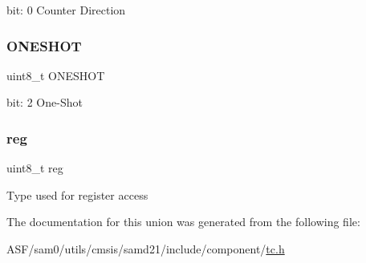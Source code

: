 bit\+: 0 Counter Direction \mbox{\label{union_t_c___c_t_r_l_b_c_l_r___type_a7b9c94dc8f69244e81941bd1c96ca561}} 
\subsubsection{\texorpdfstring{ONESHOT}{ONESHOT}}
{\footnotesize\ttfamily uint8\+\_\+t O\+N\+E\+S\+H\+OT}

bit\+: 2 One-\/\+Shot \mbox{\label{union_t_c___c_t_r_l_b_c_l_r___type_a9428adc9af4653a2050e2536b55dec8d}} 
\subsubsection{\texorpdfstring{reg}{reg}}
{\footnotesize\ttfamily uint8\+\_\+t reg}

Type used for register access 

The documentation for this union was generated from the following file\+:\begin{DoxyCompactItemize}
\item 
A\+S\+F/sam0/utils/cmsis/samd21/include/component/\mbox{\hyperlink{utils_2cmsis_2samd21_2include_2component_2tc_8h}{tc.\+h}}\end{DoxyCompactItemize}
